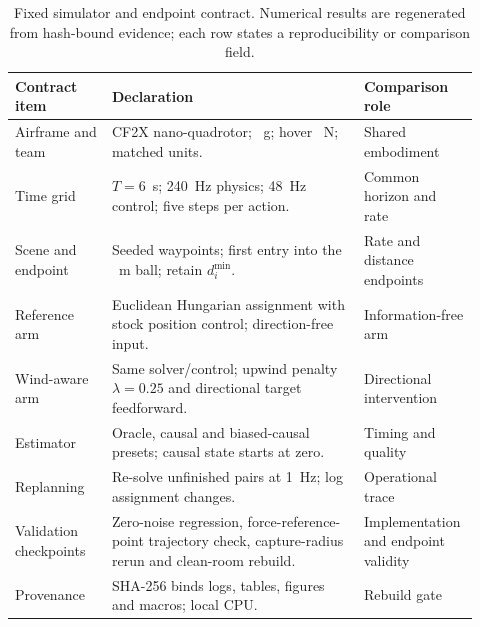 \begin{table}[!htbp]
\centering
\small
\renewcommand{\arraystretch}{1.08}
\caption{Fixed simulator and endpoint contract. Numerical results are regenerated
from hash-bound evidence; each row states a reproducibility or comparison field.}
\label{tab:parameter-contract}
\begin{tabular}{@{}>{\raggedright\arraybackslash}p{0.20\linewidth}
>{\raggedright\arraybackslash}p{0.52\linewidth}
>{\raggedright\arraybackslash}p{0.20\linewidth}@{}}
\toprule
Contract item & Declaration & Comparison role \\
\midrule
Airframe and team & CF2X nano-quadrotor; \DroneMass{}~g; hover
\HoverThrust{}~N; \NDrones{} matched units. & Shared embodiment \\
Time grid & $T=6$~s; 240~Hz physics; 48~Hz control; five steps per action. &
Common horizon and rate \\
Scene and endpoint & Seeded waypoints; first entry into the \CaptureRadius{}~m
ball; retain $d_i^{\min}$. & Rate and distance endpoints \\
Reference arm & Euclidean Hungarian assignment with stock position control;
direction-free input. & Information-free arm \\
Wind-aware arm & Same solver/control; upwind penalty $\lambda=0.25$ and
directional target feedforward. & Directional intervention \\
Estimator & Oracle, causal and biased-causal presets; causal state starts at zero.
& Timing and quality \\
Replanning & Re-solve unfinished pairs at 1~Hz; log assignment changes. &
Operational trace \\
Validation checkpoints & Zero-noise regression, force-reference-point trajectory
check, capture-radius rerun and clean-room rebuild. & Implementation and endpoint
validity \\
Provenance & SHA-256 binds logs, tables, figures and macros; local CPU. &
Rebuild gate \\
\bottomrule
\end{tabular}
\end{table}
